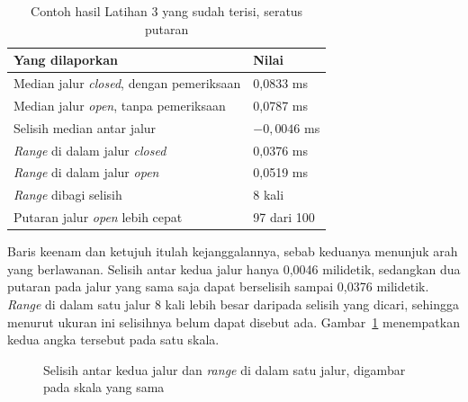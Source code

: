 \begin{table}[htbp]
  \centering
  \caption{Contoh hasil Latihan 3 yang sudah terisi, seratus putaran}
  \label{tab:lat3-contoh}
  \begin{tabularx}{\textwidth}{|X|l|}
    \hline
    \textbf{Yang dilaporkan} & \textbf{Nilai} \\
    \hline
    Median jalur \textit{closed}, dengan pemeriksaan & 0,0833 ms \\
    \hline
    Median jalur \textit{open}, tanpa pemeriksaan & 0,0787 ms \\
    \hline
    Selisih median antar jalur & $-0,0046$ ms \\
    \hline
    \textit{Range} di dalam jalur \textit{closed} & 0,0376 ms \\
    \hline
    \textit{Range} di dalam jalur \textit{open} & 0,0519 ms \\
    \hline
    \textit{Range} dibagi selisih & 8 kali \\
    \hline
    Putaran jalur \textit{open} lebih cepat & 97 dari 100 \\
    \hline
  \end{tabularx}
\end{table}

Baris keenam dan ketujuh itulah kejanggalannya, sebab keduanya menunjuk arah yang
berlawanan. Selisih antar kedua jalur hanya 0,0046 milidetik, sedangkan dua
putaran pada jalur yang sama saja dapat berselisih sampai 0,0376 milidetik.
\textit{Range} di dalam satu jalur 8 kali lebih besar daripada selisih yang
dicari, sehingga menurut ukuran ini selisihnya belum dapat disebut ada.
Gambar~\ref{fig:range-selisih} menempatkan kedua angka tersebut pada satu
skala.

\begin{figure}[htbp]
  \centering
  \caption{Selisih antar kedua jalur dan \textit{range} di dalam satu jalur, digambar
    pada skala yang sama}
  \label{fig:range-selisih}
\end{figure}

